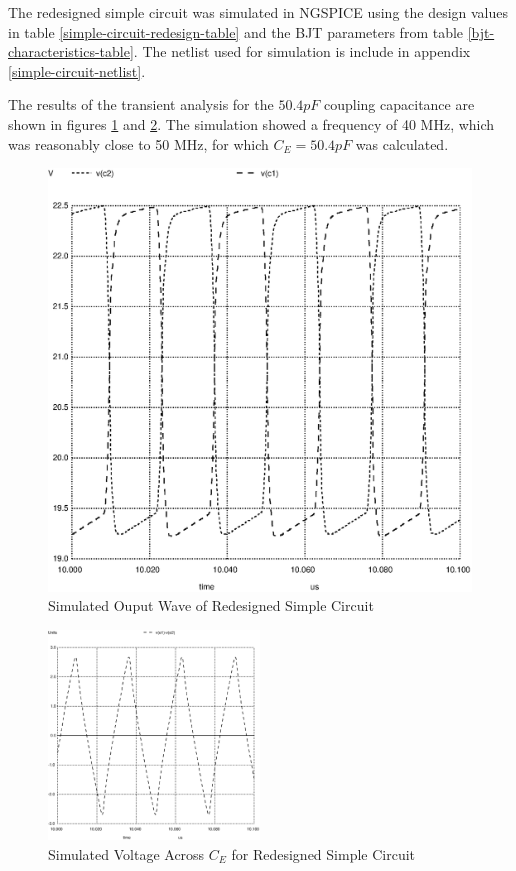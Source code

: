 \documentclass[titlepage, letterpaper, 10.5pt]{article}
\begin{document}
The redesigned simple circuit was simulated in NGSPICE using the design values in table
\ref{simple-circuit-redesign-table} and the BJT parameters from table
\ref{bjt-characteristics-table}. The netlist used for simulation is include in appendix
\ref{simple-circuit-netlist}.

The results of the transient analysis for the
$50.4pF$ coupling capacitance are shown in figures \ref{simple-circuit-output-50pF}
and \ref{simple-circuit-vcap-50pF}. The simulation showed a frequency of 40 MHz,
which was reasonably close to 50 MHz, for which $C_{E}=50.4pF$ was calculated.

\begin{figure}[ht]
	\centering
	\includegraphics[width=.5\textwidth]{ngspice/simple-circuit-output-50pF}
	\caption{Simulated Ouput Wave of Redesigned Simple Circuit}
	\label{simple-circuit-output-50pF}
\end{figure}

\begin{figure}[ht]
	\centering
	\includegraphics[width=0.5\textwidth]{ngspice/simple-circuit-vcap-50pF}
	\caption{Simulated Voltage Across $C_{E}$ for Redesigned Simple Circuit}
	\label{simple-circuit-vcap-50pF}
\end{figure}
\end{document}

